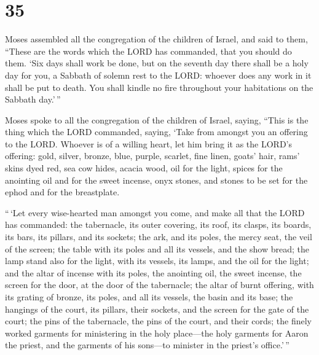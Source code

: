 \hypertarget{section-34}{%
\section{35}\label{section-34}}

 Moses assembled all the congregation of the children of
Israel, and said to them, ``These are the words which the LORD has
commanded, that you should do them.  `Six days shall work
be done, but on the seventh day there shall be a holy day for you, a
Sabbath of solemn rest to the LORD: whoever does any work in it shall be
put to death.  You shall kindle no fire throughout your
habitations on the Sabbath day.'\,''

 Moses spoke to all the congregation of the children of
Israel, saying, ``This is the thing which the LORD commanded, saying,
 `Take from amongst you an offering to the LORD. Whoever
is of a willing heart, let him bring it as the LORD's offering: gold,
silver, bronze,  blue, purple, scarlet, fine linen, goats'
hair,  rams' skins dyed red, sea cow hides, acacia wood,
 oil for the light, spices for the anointing oil and for
the sweet incense,  onyx stones, and stones to be set for
the ephod and for the breastplate.

 ``\,`Let every wise-hearted man amongst you come, and
make all that the LORD has commanded:  the tabernacle,
its outer covering, its roof, its clasps, its boards, its bars, its
pillars, and its sockets;  the ark, and its poles, the
mercy seat, the veil of the screen;  the table with its
poles and all its vessels, and the show bread;  the lamp
stand also for the light, with its vessels, its lamps, and the oil for
the light;  and the altar of incense with its poles, the
anointing oil, the sweet incense, the screen for the door, at the door
of the tabernacle;  the altar of burnt offering, with its
grating of bronze, its poles, and all its vessels, the basin and its
base;  the hangings of the court, its pillars, their
sockets, and the screen for the gate of the court;  the
pins of the tabernacle, the pins of the court, and their cords;
 the finely worked garments for ministering in the holy
place---the holy garments for Aaron the priest, and the garments of his
sons---to minister in the priest's office.'\,''

